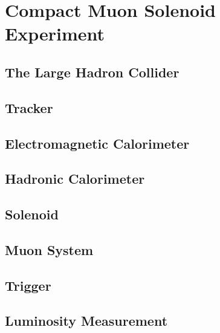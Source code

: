 \chapter{Compact Muon Solenoid Experiment
\label{ch:cmsexperiment}}

\setcounter{section}{-1}

\section{The Large Hadron Collider}

\section{Tracker}

\section{Electromagnetic Calorimeter}

\section{Hadronic Calorimeter}

\section{Solenoid}

\section{Muon System}

\section{Trigger}

\section{Luminosity Measurement}